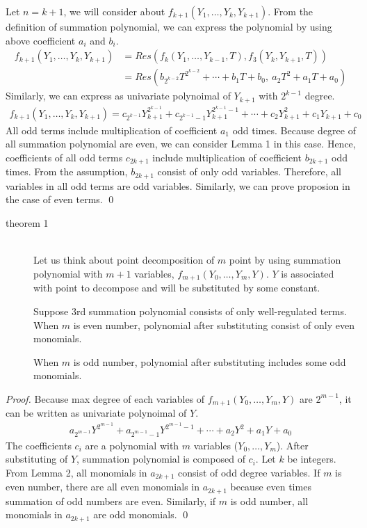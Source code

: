 Let $n=k+1$, we will consider about $f_{k+1}(Y_1, \dots , Y_{k}, Y_{k+1})$.
%
From the definition of summation polynomial, we can express the polynomial
by using above coefficient $a_i$ and $b_i$.
%
\begin{align*}
  f_{k+1}(Y_1, \dots , Y_{k}, Y_{k+1}) &= 
   Res\left(f_{k}(Y_1, \dots , Y_{k-1}, T), f_3(Y_{k}, Y_{k+1}, T)\right)\\
   & = Res(b_{2^{k-2}}T^{2^{k-2}} + \cdots + b_1T + b_0,~ a_2T^2 + a_1T + a_0)
\end{align*}
%
Similarly, we can express as univariate polynoimal of $Y_{k+1}$ 
with $2^{k-1}$ degree.
%
\begin{align*}
  f_{k+1}(Y_1, \dots , Y_{k}, Y_{k+1}) =
  c_{2^{k-1}}Y_{k+1}^{2^{k-1}} + c_{2^{k-1}-1}Y_{k+1}^{2^{k-1}-1} + 
   \cdots + c_2Y_{k+1}^2 + c_1Y_{k+1} + c_0
\end{align*}
%
All odd terms include multiplication of coefficient $a_1$ odd times.
%
Because degree of all summation polynomial are even, 
we can consider Lemma 1 in this case.
%
Hence, coefficients of all odd terms $c_{2k+1}$ include 
multiplication of coefficient $b_{2k+1}$ odd times.
%
From the assumption, $b_{2k+1}$ consist of only odd variables.
%
Therefore, all variables in all odd terms are odd variables.
%
Similarly, we can prove proposion in the case of even terms.
%
\qed \\


\begin{description}
  \item [theorem 1]~\\
  Let us think about point decomposition of $m$ point 
  by using summation polynomial with $m+1$ variables, 
  $f_{m+1}(Y_0, \dots, Y_m, Y)$.
  $Y$ is associated with point to decompose 
  and will be substituted by some constant.

  Suppose 3rd summation polynomial consists of only well-regulated terms.
  When $m$ is even number,
  polynomial after substituting consist of only even monomials.

  When $m$ is odd number,
  polynomial after substituting includes some odd monomials.
\end{description}

\noindent
\emph{Proof.}
%
Because max degree of each variables of 
$f_{m+1}(Y_0, \dots, Y_m, Y)$ are $2^{m-1}$,
it can be written as univariate polynoimal of $Y$.
%
\begin{align*}
  a_{2^{m-1}}Y^{2^{m-1}} + a_{2^{m-1}-1}Y^{2^{m-1}-1} + 
  \cdots + a_2Y^2 + a_1Y + a_0
\end{align*}
%
The coefficients $c_i$ are a polynomial 
with $m$ variables ($Y_0, \dots, Y_m$).
%
After substituting of $Y$, summation polynomial is composed of $c_i$.
%
Let $k$ be integers. 
From Lemma 2, all monomials in $a_{2k+1}$ consist of odd degree variables.
%
If $m$ is even number, there are all even monomials in $a_{2k+1}$
because even times summation of odd numbers are even.
%
Similarly, if $m$ is odd number, all monomials in $a_{2k+1}$ are odd monomials.
\qed \\


